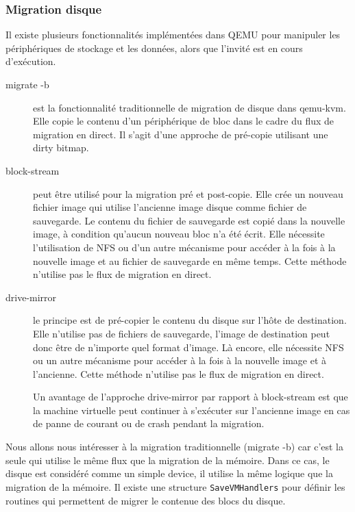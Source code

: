 \subsubsection{Migration disque}
Il existe plusieurs fonctionnalités implémentées dans QEMU pour manipuler les périphériques de stockage et les données, alors que l'invité est en cours d'exécution.
\begin{description}
    \item[migrate -b] est la fonctionnalité traditionnelle de migration de disque dans qemu-kvm.
    Elle copie le contenu d'un périphérique de bloc dans le cadre du flux de migration en direct.
    Il s'agit d'une approche de pré-copie utilisant une dirty bitmap.

    \item[block-stream] peut être utilisé pour la migration pré et post-copie.
    Elle crée un nouveau fichier image qui utilise l'ancienne image disque comme fichier de sauvegarde.
    Le contenu du fichier de sauvegarde est copié dans la nouvelle image, à condition qu'aucun nouveau bloc n'a été écrit.
    Elle nécessite l'utilisation de NFS ou d'un autre mécanisme pour accéder à la fois à la nouvelle image et au fichier de sauvegarde en même temps.
    Cette méthode n'utilise pas le flux de migration en direct.

    \item[drive-mirror] le principe est de pré-copier le contenu du disque sur l'hôte de destination.
    Elle n'utilise pas de fichiers de sauvegarde, l'image de destination peut donc être de n'importe quel format d'image.
    Là encore, elle nécessite NFS ou un autre mécanisme pour accéder à la fois à la nouvelle image et à l'ancienne.
    Cette méthode n'utilise pas le flux de migration en direct.

    Un avantage de l'approche drive-mirror par rapport à block-stream est que la machine virtuelle peut continuer à s'exécuter sur l'ancienne image en cas de panne de courant ou de crash pendant la migration.
\end{description}


Nous allons nous intéresser à la migration traditionnelle (migrate -b) car c'est la seule qui utilise le même flux que la migration de la mémoire.
Dans ce cas, le disque est considéré comme un simple device, il utilise la même logique que la migration de la mémoire.
Il existe une structure \texttt{SaveVMHandlers} pour définir les routines qui permettent de migrer le contenue des blocs du disque.

